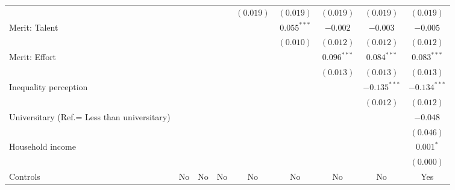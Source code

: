 \documentclass[
  10pt]{article}
\begin{document}
\begin{table}
{\begin{center}
{\begin{tabular}{l c c c c c c c c}
                                            &                &                &                & $(0.019)$      & $(0.019)$      & $(0.019)$      & $(0.019)$      & $(0.019)$      \\
Merit: Talent                               &                &                &                &                & $0.055^{***}$  & $-0.002$       & $-0.003$       & $-0.005$       \\
                                            &                &                &                &                & $(0.010)$      & $(0.012)$      & $(0.012)$      & $(0.012)$      \\
Merit: Effort                               &                &                &                &                &                & $0.096^{***}$  & $0.084^{***}$  & $0.083^{***}$  \\
                                            &                &                &                &                &                & $(0.013)$      & $(0.013)$      & $(0.013)$      \\
Inequality perception                       &                &                &                &                &                &                & $-0.135^{***}$ & $-0.134^{***}$ \\
                                            &                &                &                &                &                &                & $(0.012)$      & $(0.012)$      \\
Universitary (Ref.= Less than universitary) &                &                &                &                &                &                &                & $-0.048$       \\
                                            &                &                &                &                &                &                &                & $(0.046)$      \\
Household income                            &                &                &                &                &                &                &                & $0.001^{*}$    \\
                                            &                &                &                &                &                &                &                & $(0.000)$      \\
\hline
Controls                                    & No             & No             & No             & No             & No             & No             & No             & Yes            \\

\end{tabular}}
\end{center}}
\end{table}
\end{document}
